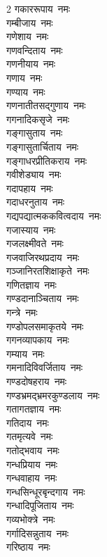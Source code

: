 \begin{flushleft}
\begin{multicols}{2}
गकाररूपाय~नमः\\
गम्बीजाय~नमः\\
गणेशाय~नमः\\
गणवन्दिताय~नमः\\
गणनीयाय~नमः\\
गणाय~नमः\\
गण्याय~नमः\\
गणनातीतसद्गुणाय~नमः\\
गगनादिकसृजे~नमः\\
गङ्गासुताय~नमः\hfill{}\\
गङ्गासुतार्चिताय~नमः\\
गङ्गाधरप्रीतिकराय~नमः\\
गवीशेड्याय~नमः\\
गदापहाय~नमः\\
गदाधरनुताय~नमः\\
गद्यपद्यात्मककवित्वदाय~नमः\\
गजास्याय~नमः\\
गजलक्ष्मीवते~नमः\\
गजवाजिरथप्रदाय~नमः\\
गञ्जानिरतशिक्षाकृते~नमः\hfill{}\\
गणितज्ञाय~नमः\\
गण्डदानाञ्चिताय~नमः\\
गन्त्रे~नमः\\
गण्डोपलसमाकृतये~नमः\\
गगनव्यापकाय~नमः\\
गम्याय~नमः\\
गमनादिविवर्जिताय~नमः\\
गण्डदोषहराय~नमः\\
गण्डभ्रमद्भ्रमरकुण्डलाय~नमः\\
गतागतज्ञाय~नमः\hfill{}\\
गतिदाय~नमः\\
गतमृत्यवे~नमः\\
गतोद्भवाय~नमः\\
गन्धप्रियाय~नमः\\
गन्धवाहाय~नमः\\
गन्धसिन्धूरबृन्दगाय~नमः\\
गन्धादिपूजिताय~नमः\\
गव्यभोक्त्रे~नमः\\
गर्गादिसन्नुताय~नमः\\
गरिष्ठाय~नमः\hfill{}\\

\end{multicols}
\end{flushleft}
